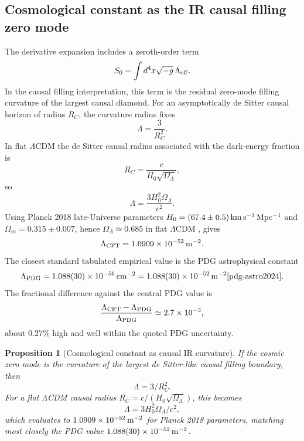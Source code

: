\documentclass[11pt]{article}
\newtheorem{proposition}[definition]{Proposition}
\begin{document}
\subsection{Cosmological constant as the IR causal filling zero mode}

The derivative expansion includes a zeroth-order term
\begin{equation}
S_0=\int d^4x\sqrt{-g}\,\Lambda_{\rm eff}.
\end{equation}
In the causal filling interpretation, this term is the residual zero-mode filling curvature of the largest causal diamond. For an asymptotically de Sitter causal horizon of radius $R_C$, the curvature radius fixes
\begin{equation}
\boxed{\Lambda=\frac{3}{R_C^2}.}
\end{equation}
In flat $\Lambda$CDM the de Sitter causal radius associated with the dark-energy fraction is
\begin{equation}
R_C=\frac{c}{H_0\sqrt{\Omega_\Lambda}},
\end{equation}
so
\begin{equation}
\boxed{\Lambda=\frac{3H_0^2\Omega_\Lambda}{c^2}.}
\end{equation}
Using Planck 2018 late-Universe parameters $H_0=(67.4\pm0.5)\,{\rm km\,s^{-1}\,Mpc^{-1}}$ and $\Omega_m=0.315\pm0.007$, hence $\Omega_\Lambda\simeq0.685$ in flat $\Lambda$CDM \cite{planck2018}, gives
\begin{equation}
\Lambda_{\rm CFT}=1.0909\times10^{-52}\,{\rm m^{-2}}.
\end{equation}
The closest standard tabulated empirical value is the PDG astrophysical constant
\begin{equation}
\Lambda_{\rm PDG}=1.088(30)\times10^{-56}\,{\rm cm^{-2}}
=1.088(30)\times10^{-52}\,{\rm m^{-2}}\cite{pdg-astro2024}.
\end{equation}
The fractional difference against the central PDG value is
\begin{equation}
\frac{\Lambda_{\rm CFT}-\Lambda_{\rm PDG}}{\Lambda_{\rm PDG}}
\simeq 2.7\times10^{-3},
\end{equation}
about $0.27\%$ high and well within the quoted PDG uncertainty.

\begin{proposition}[Cosmological constant as causal IR curvature]
If the cosmic zero mode is the curvature of the largest de Sitter-like causal filling boundary, then
\begin{equation}
\Lambda=3/R_C^2.
\end{equation}
For a flat $\Lambda$CDM causal radius $R_C=c/(H_0\sqrt{\Omega_\Lambda})$, this becomes
\begin{equation}
\Lambda=3H_0^2\Omega_\Lambda/c^2,
\end{equation}
which evaluates to $1.0909\times10^{-52}\,{\rm m^{-2}}$ for Planck 2018 parameters, matching most closely the PDG value $1.088(30)\times10^{-52}\,{\rm m^{-2}}$.
\end{proposition}
\end{document}
